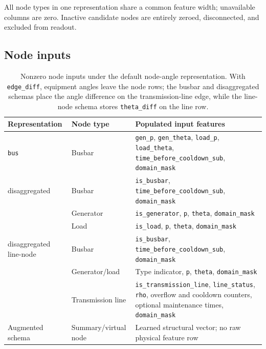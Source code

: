 All node types in one representation share a common feature width; unavailable
columns are zero. Inactive candidate nodes are entirely zeroed, disconnected,
and excluded from readout.

\subsection{Node inputs}
\label{sec:gnn-node-input-inventory}

\begin{table}[H]
  \centering
  \scriptsize
  \caption{Nonzero node inputs under the default node-angle representation.
  With \texttt{edge\_diff}, equipment angles leave the node rows; the busbar
  and disaggregated schemas place the angle difference on the transmission-line
  edge, while the line-node schema stores \texttt{theta\_diff} on the line row.}
  \label{tab:gine-gat-node-inventory}
  \label{tab:graph-node-features}
  \label{tab:heterogeneous-node-features}
  \label{tab:heterogeneous-line-node-features}
  \setlength{\tabcolsep}{3pt}
  \begin{tabular}{L{0.18\textwidth}L{0.17\textwidth}L{0.56\textwidth}}
    \toprule
    Representation & Node type & Populated input features \\
    \midrule
    \texttt{bus} & Busbar & \texttt{gen\_p}, \texttt{gen\_theta}, \texttt{load\_p}, \texttt{load\_theta}, \texttt{time\_before\_cooldown\_sub}, \texttt{domain\_mask} \\
    \midrule
    disaggregated & Busbar & \texttt{is\_busbar}, \texttt{time\_before\_cooldown\_sub}, \texttt{domain\_mask} \\
     & Generator & \texttt{is\_generator}, \texttt{p}, \texttt{theta}, \texttt{domain\_mask} \\
     & Load & \texttt{is\_load}, \texttt{p}, \texttt{theta}, \texttt{domain\_mask} \\
    \midrule
    disaggregated line-node & Busbar & \texttt{is\_busbar}, \texttt{time\_before\_cooldown\_sub}, \texttt{domain\_mask} \\
     & Generator/load & Type indicator, \texttt{p}, \texttt{theta}, \texttt{domain\_mask} \\
     & Transmission line & \texttt{is\_transmission\_line}, \texttt{line\_status}, \texttt{rho}, overflow and cooldown counters, optional maintenance times, \texttt{domain\_mask} \\
    \midrule
    Augmented schema & Summary/virtual node & Learned structural vector; no raw physical feature row \\
    \bottomrule
  \end{tabular}
\end{table}

